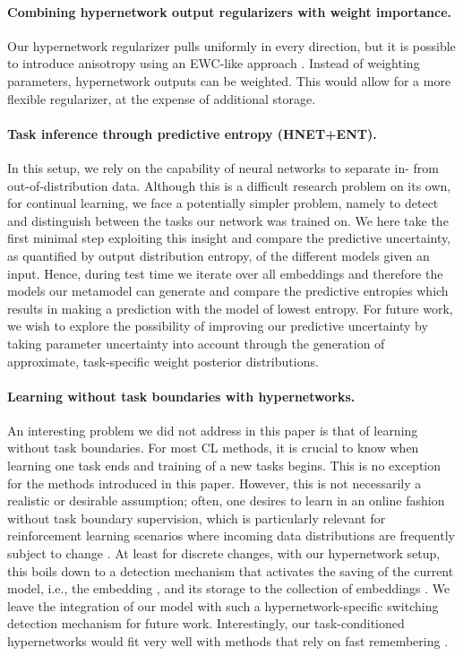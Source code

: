 \documentclass{article}
\begin{document}
\paragraph{Combining hypernetwork output regularizers with weight importance.} Our hypernetwork regularizer pulls uniformly in every direction, but it is possible to introduce anisotropy using an EWC-like approach \citep{kirkpatrick_overcoming_2017}. Instead of weighting parameters, hypernetwork outputs can be weighted. This would allow for a more flexible regularizer, at the expense of additional storage.

\paragraph{Task inference through predictive entropy (HNET+ENT).} In this setup, we rely on the capability of neural networks to separate in- from out-of-distribution data. Although this is a difficult research problem on its own, for continual learning, we face a potentially simpler problem, namely to detect and distinguish between the tasks our network was trained on. We here take the first minimal step exploiting this insight and compare the predictive uncertainty, as quantified by output distribution entropy, of the different models given an input. Hence, during test time we iterate over all embeddings and therefore the models our metamodel can generate and compare the predictive entropies which results in making a prediction with the model of lowest entropy.
For future work, we wish to explore the possibility of improving our predictive uncertainty by taking parameter uncertainty into account through the generation of approximate, task-specific weight posterior distributions.

\paragraph{Learning without task boundaries with hypernetworks.} An interesting problem we did not address in this paper is that of learning without task boundaries. For most CL methods, it is crucial to know when learning one task ends and training of a new tasks begins. This is no exception for the methods introduced in this paper. However, this is not necessarily a realistic or desirable assumption; often, one desires to learn in an online fashion without task boundary supervision, which is particularly relevant for reinforcement learning scenarios where incoming data distributions are frequently subject to change \citep{rolnick2018experience}. At least for discrete changes, with our hypernetwork setup, this boils down to a detection mechanism that activates the saving of the current model, i.e., the embedding , and its storage to the collection of embeddings . We leave the integration of our model with such a hypernetwork-specific switching detection mechanism for future work. Interestingly, our task-conditioned hypernetworks would fit very well with methods that rely on fast remembering \citep[a recently proposed approach which appeared in parallel to our paper,][]{he2019task}.
\end{document}
